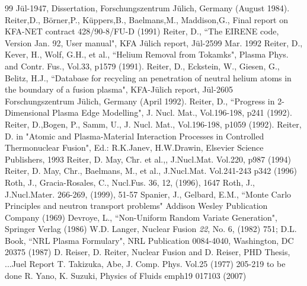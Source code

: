 \begin{thebibliography}{99}
                        J\"ul-1947, Dissertation,
                        Forschungszentrum J\"ulich, Germany (August 1984).
 Reiter,D., B\"orner,P., K\"uppers,B., Baelmans,M.,
                       Maddison,G., Final report on KFA-NET
                       contract 428/90-8/FU-D (1991)
 Reiter, D., ``The EIRENE code, Version Jan. 92,
                       User manual", KFA J\"ulich report, J\"ul-2599
                       Mar. 1992
  Reiter, D., Kever, H., Wolf, G.H., et al.,
                        ``Helium Removal from Tokamks",
                        Plasma Phys. and Contr. Fus., Vol.33,
                        p1579 (1991).
 Reiter, D., Eckstein, W., Giesen, G., Belitz,
                    H.J.,
                    ``Database for recycling an penetration of neutral
                    helium atoms in the boundary of a fusion plasma", KFA-J\"ulich report,
                    J\"ul-2605
                    Forschungszentrum J\"ulich, Germany (April 1992).
  Reiter, D., ``Progress in 2-Dimensional Plasma
                        Edge Modelling", J. Nucl. Mat., Vol.196-198,
                        p241 (1992).
  Reiter, D.,Bogen, P., Samm, U.,
                        J. Nucl. Mat., Vol.196-198,
                        p1059 (1992).
 Reiter, D. in "Atomic and Plasma-Material
                      Interaction Processes in Controlled Thermonuclear Fusion", Ed.:
                      R.K.Janev, H.W.Drawin, Elsevier Science Publishers, 1993
 Reiter, D. May, Chr. et al.,,
                      J.Nucl.Mat. Vol.220, p987 (1994)
 Reiter, D. May, Chr., Baelmans, M., et al.,
                      J.Nucl.Mat. Vol.241-243 p342 (1996)
 Roth, J., Gracia-Rosales, C.,
                    Nucl.Fus. 36, 12, (1996), 1647
 Roth, J.,                     J.Nucl.Mater. 266-269, (1999), 51-57
 Spanier, J., Gelbard, E.M.,
                    ``Monte Carlo Principles and neutron transport problems"
                    Addison Wesley Publication Company (1969)
 Devroye, L., ``Non-Uniform Random Variate Generation",
                      Springer Verlag (1986)
 W.D. Langer, Nuclear Fusion \emph{22}, No. 6, (1982) 751;
 D.L. Book, ``NRL Plasma Formulary", NRL Publication 0084-4040, Washington, DC 20375 (1987)
 D. Reiser, D. Reiter, Nuclear Fusion and D. Reiser, PHD Thesis, ...Juel Report
 T. Takizuka, Abe,  J. Comp. Phys.  Vol.25 (1977) 205-219
 to be done
  R. Yano, K. Suzuki, Physics of Fluids emph{19} 017103 (2007)

\end{thebibliography}

